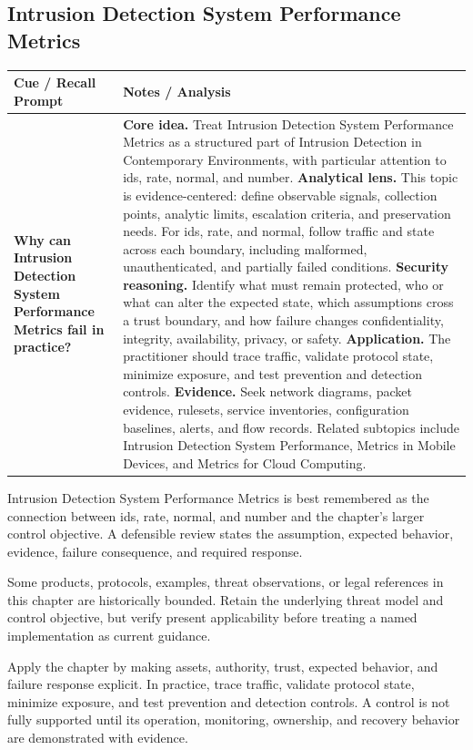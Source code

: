 \documentclass[11pt]{article}
\newcommand{\CornellHeader}{%
\rowcolor{Navy}\color{white}\bfseries Cue / Recall Prompt & \color{white}\bfseries Notes / Analysis\\\hline}
\newcommand{\CornellRow}[2]{%
\cellcolor{CueGray}\RaggedRight\textbf{#1} & \RaggedRight #2\\\hline}
\begin{document}
\subsection*{Intrusion Detection System Performance Metrics}
\begin{longtable}{>{\RaggedRight\arraybackslash}p{}|>{\RaggedRight\arraybackslash}p{}}
\CornellHeader
\CornellRow{Why can Intrusion Detection System Performance Metrics fail in practice?}{\textbf{Core idea.} Treat Intrusion Detection System Performance Metrics as a structured part of Intrusion Detection in Contemporary Environments, with particular attention to ids, rate, normal, and number. \textbf{Analytical lens.} This topic is evidence-centered: define observable signals, collection points, analytic limits, escalation criteria, and preservation needs. For ids, rate, and normal, follow traffic and state across each boundary, including malformed, unauthenticated, and partially failed conditions. \textbf{Security reasoning.} Identify what must remain protected, who or what can alter the expected state, which assumptions cross a trust boundary, and how failure changes confidentiality, integrity, availability, privacy, or safety. \textbf{Application.} The practitioner should trace traffic, validate protocol state, minimize exposure, and test prevention and detection controls. \textbf{Evidence.} Seek network diagrams, packet evidence, rulesets, service inventories, configuration baselines, alerts, and flow records. Related subtopics include Intrusion Detection System Performance, Metrics in Mobile Devices, and Metrics for Cloud Computing.}
\end{longtable}
\begin{topicsummary}
Intrusion Detection System Performance Metrics is best remembered as the connection between ids, rate, normal, and number and the chapter's larger control objective. A defensible review states the assumption, expected behavior, evidence, failure consequence, and required response.
\end{topicsummary}
\begin{historybox}
Some products, protocols, examples, threat observations, or legal references in this chapter are historically bounded. Retain the underlying threat model and control objective, but verify present applicability before treating a named implementation as current guidance.
\end{historybox}
\begin{defensebox}
Apply the chapter by making assets, authority, trust, expected behavior, and failure response explicit. In practice, trace traffic, validate protocol state, minimize exposure, and test prevention and detection controls. A control is not fully supported until its operation, monitoring, ownership, and recovery behavior are demonstrated with evidence.
\end{defensebox}
\end{document}
